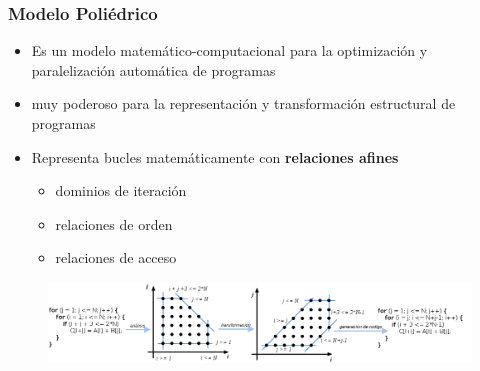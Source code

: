 \documentclass{beamer}\usetheme{Madrid} %
\begin{document}
\begin{frame} 
\frametitle{Modelo Poliédrico}
	\begin{itemize} 
	\item Es un modelo matemático-computacional para la optimización y 
			paralelización automática de programas
	\item muy poderoso para la representación y transformación estructural de programas
	\item Representa bucles matemáticamente con \textbf{relaciones afines}
		\begin{itemize}
		\item dominios de iteración
		\item relaciones de orden
		\item relaciones de acceso
		\end{itemize}
	\end{itemize}
		\begin{figure}
			\includegraphics[scale=0.30]{img/poly_pipeline2.png}
		\end{figure}
\end{frame}
\end{document}
